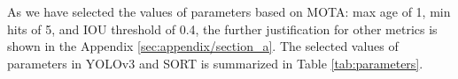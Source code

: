 As we have selected the values of parameters based on MOTA: max age of 1, min hits of 5, and IOU threshold of 0.4, the further justification for other metrics is shown in the Appendix \ref{sec:appendix/section_a}. The selected values of parameters in YOLOv3 and SORT is summarized in Table \ref{tab:parameters}.
